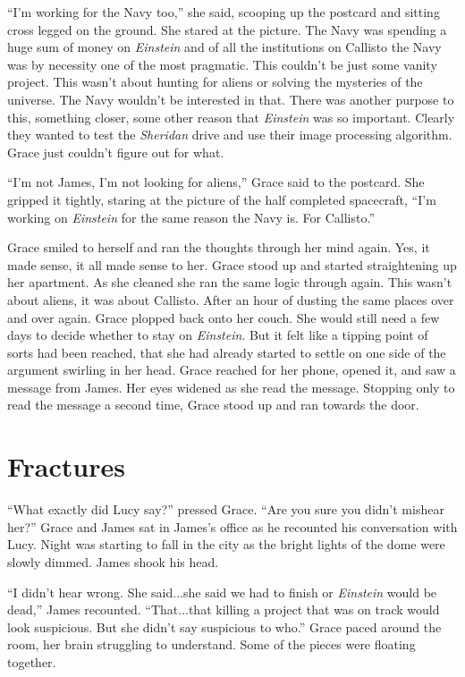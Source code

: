 \documentclass[openany, 12pt]{book} %
\begin{document}
``I'm working for the Navy too,'' she said, scooping up the postcard and sitting cross legged on the ground. She stared at the picture. The Navy was spending a huge sum of money on \textit{Einstein} and of all the institutions on Callisto the Navy was by necessity one of the most pragmatic. This couldn't be just some vanity project. This wasn't about hunting for aliens or solving the mysteries of the universe. The Navy wouldn't be interested in that. There was another purpose to this, something closer, some other reason that \textit{Einstein} was so important. Clearly they wanted to test the \textit{Sheridan} drive and use their image processing algorithm. Grace just couldn't figure out for what.

``I'm not James, I'm not looking for aliens,'' Grace said to the postcard. She gripped it tightly, staring at the picture of the half completed spacecraft, ``I'm working on \textit{Einstein} for the same reason the Navy is. For Callisto.''

Grace smiled to herself and ran the thoughts through her mind again. Yes, it made sense, it all made sense to her. Grace stood up and started straightening up her apartment. As she cleaned she ran the same logic through again. This wasn't about aliens, it was about Callisto. After an hour of dusting the same places over and over again. Grace plopped back onto her couch. She would still need a few days to decide whether to stay on \textit{Einstein}. But it felt like a tipping point of sorts had been reached, that she had already started to settle on one side of the argument swirling in her head. Grace reached for her phone, opened it, and saw a message from James. Her eyes widened as she read the message. Stopping only to read the message a second time, Grace stood up and ran towards the door.

\chapter{Fractures}

``What exactly did Lucy say?'' pressed Grace. ``Are you sure you didn't mishear her?'' Grace and James sat in James's office as he recounted his conversation with Lucy. Night was starting to fall in the city as the bright lights of the dome were slowly dimmed. James shook his head.

``I didn't hear wrong. She said...she said we had to finish or \textit{Einstein} would be dead,'' James recounted. ``That...that killing a project that was on track would look suspicious. But she didn't say suspicious to who.'' Grace paced around the room, her brain struggling to understand. Some of the pieces were floating together.
\end{document}
